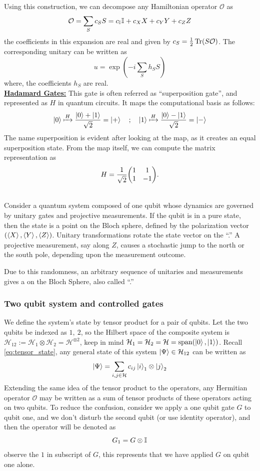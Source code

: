 \documentclass[11pt, oneside, listof=totoc]{scrbook}
\renewcommand{\H}{\mathcal{H}}
\renewcommand{\O}{\mathcal{O}}
\newcommand{\ku}{\ket{0}}
\newcommand{\kd}{\ket{1}}
\newcommand{\kr}{\ket{+}}
\newcommand{\kl}{\ket{-}}
\begin{document}
Using this construction, we can decompose any Hamiltonian operator \(\O\) as
\[
    \O = \sum_{S} c_S S = c_{\I{}} \I{} + c_X X + c_Y Y + c_Z Z
\]
the coefficients in this expansion are real and given by \(c_S = \half \Tr(S \O)\). The corresponding unitary can be written as
\[
    u = \exp(- i \sum_{S} h_S S)
\]
where, the coefficients \(h_S\) are real.\\
{\bfseries \uline{Hadamard Gates:}} This gate is often referred as ``superposition gate'', and represented as \(H\) in quantum circuits. It maps the computational basis as follows:
\begin{equation*}
    \ku \xmapsto{H} \frac{\ku + \kd}{\sqrt{2}} = \kr \quad ; \quad \kd \xmapsto{H} \frac{\ku - \kd}{\sqrt{2}} = \kl
\end{equation*}
The name superposition is evident after looking at the map, as it creates an equal superposition state. From the map itself, we can compute the matrix representation as
\begin{equation}\label{eq:hadamard}
    H = \frac{1}{\sqrt{2}} \mqty(1 & 1 \\ 1 & -1).
\end{equation}

\\
Consider a quantum system composed of one qubit whose dynamics are governed by unitary gates and projective measurements. If the qubit is in a pure state, then the state is a point on the Bloch sphere, defined by the polarization vector $(\expval{X}, \expval{Y}, \expval{Z})$. Unitary transformations rotate the state vector on the ``.'' A projective measurement, say along \(Z\), causes a stochastic jump to the north or the south pole, depending upon the measurement outcome.

Due to this randomness, an arbitrary sequence of unitaries and measurements gives a  on the Bloch Sphere, also called ``.''\cite{Fisher2023}

\subsubsection{Two qubit system and controlled gates}

We define the system's state by tensor product for a pair of qubits. Let the two qubits be indexed as \(1, ~2\), so the Hilbert space of the composite system is \(\H_{12} := \H_1 \otimes \H_2 = \H^{\otimes 2}\), keep in mind \(\H_1 = \H_2 = \H = \Span(\ku, \kd)\). Recall \cref{eq:tensor_state}, any general state of this system \(\ket{\Psi} \in \H_{12}\) can be written as
\[
    \ket{\Psi} = \sum_{i, j \in \H} c_{i j} \ket{i}_1 \otimes \ket{j}_2
\]
Extending the same idea of the tensor product to the operators, any Hermitian operator \(\O\) may be written as a sum of tensor products of these operators acting on two qubits. To reduce the confusion, consider we apply a one qubit gate \(G\) to qubit one, and we don't disturb the second qubit (or use identity operator), and then the operator will be denoted as
\[
    G_1 = G \otimes \mathbb{I}_{}
\]
observe the \(1\) in subscript of \(G\), this represents that we have applied \(G\) on qubit one alone.\\
\end{document}
